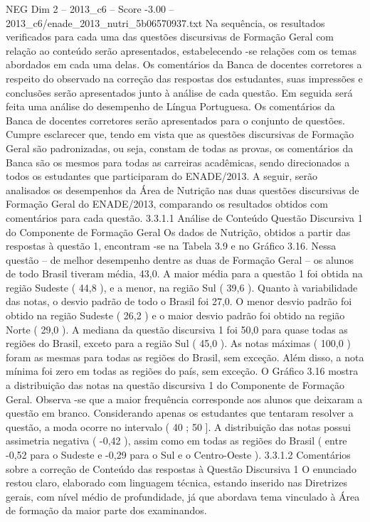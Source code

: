 \begin{textsample}{NEG Dim 2 – 2013\_c6 – Score -3.00 – 2013\_c6/enade\_2013\_nutri\_5b06570937.txt}
Na sequência, os resultados verificados para cada uma das questões discursivas de Formação Geral com relação ao conteúdo serão apresentados, estabelecendo -se relações com os temas abordados em cada uma delas.
Os comentários da Banca de docentes corretores a respeito do observado na correção das respostas dos estudantes, suas impressões e conclusões serão apresentados junto à análise de cada questão.
Em seguida será feita uma análise do desempenho de Língua Portuguesa.
Os comentários da Banca de docentes corretores serão apresentados para o conjunto de questões.
Cumpre esclarecer que, tendo em vista que as questões discursivas de Formação Geral são padronizadas, ou seja, constam de todas as provas, os comentários da Banca são os mesmos para todas as carreiras acadêmicas, sendo direcionados a todos os estudantes que participaram do ENADE/2013.
A seguir, serão analisados os desempenhos da Área de Nutrição nas duas questões discursivas de Formação Geral do ENADE/2013, comparando os resultados obtidos com comentários para cada questão. 3.3.1.1 Análise de Conteúdo Questão Discursiva 1 do Componente de Formação Geral Os dados de Nutrição, obtidos a partir das respostas à questão 1, encontram -se na Tabela 3.9 e no Gráfico 3.16.
Nessa questão – de melhor desempenho dentre as duas de Formação Geral – os alunos de todo Brasil tiveram média, 43,0.
A maior média para a questão 1 foi obtida na região Sudeste ( 44,8 ), e a menor, na região Sul ( 39,6 ).
Quanto à variabilidade das notas, o desvio padrão de todo o Brasil foi 27,0.
O menor desvio padrão foi obtido na região Sudeste ( 26,2 ) e o maior desvio padrão foi obtido na região Norte ( 29,0 ).
A mediana da questão discursiva 1 foi 50,0 para quase todas as regiões do Brasil, exceto para a região Sul ( 45,0 ).
As notas máximas ( 100,0 ) foram as mesmas para todas as regiões do Brasil, sem exceção.
Além disso, a nota mínima foi zero em todas as regiões do país, sem exceção.
O Gráfico 3.16 mostra a distribuição das notas na questão discursiva 1 do Componente de Formação Geral.
Observa -se que a maior frequência corresponde aos alunos que deixaram a questão em branco.
Considerando apenas os estudantes que tentaram resolver a questão, a moda ocorre no intervalo ( 40 ; 50 ].
A distribuição das notas possui assimetria negativa ( -0,42 ), assim como em todas as regiões do Brasil ( entre -0,52 para o Sudeste e -0,29 para o Sul e o Centro-Oeste ). 3.3.1.2 Comentários sobre a correção de Conteúdo das respostas à Questão Discursiva 1 O enunciado restou claro, elaborado com linguagem técnica, estando inserido nas Diretrizes gerais, com nível médio de profundidade, já que abordava tema vinculado à Área de formação da maior parte dos examinandos.

\end{textsample}
